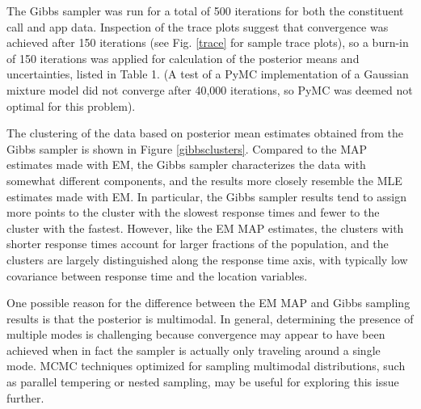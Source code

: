 \documentclass[twoside]{article}
\theoremstyle{theorem}
\theoremstyle{theorem}
\theoremstyle{theorem}
\theoremstyle{lemma}
\theoremstyle{definition}
\theoremstyle{example}
\begin{document}
The Gibbs sampler was run for a total of 500 iterations for both the constituent call and app data. Inspection of the trace plots suggest that convergence was achieved after 150 iterations (see Fig. \ref{trace} for sample trace plots), so a burn-in of 150 iterations was applied for calculation of the posterior means and uncertainties, listed in Table 1. (A test of a PyMC implementation of a Gaussian mixture model did not converge after 40,000 iterations, so PyMC was deemed not optimal for this problem). 

The clustering of the data based on posterior mean estimates obtained from the Gibbs sampler is shown in Figure \ref{gibbsclusters}. Compared to the MAP estimates made with EM, the Gibbs sampler characterizes the data with somewhat different components, and the results more closely resemble the MLE estimates made with EM. In particular, the Gibbs sampler results tend to assign more points to the cluster with the slowest response times and fewer to the cluster with the fastest. However, like the EM MAP estimates, the clusters with shorter response times account for larger fractions of the population, and the clusters are largely distinguished along the response time axis, with typically low covariance between response time and the location variables. 

One possible reason for the difference between the EM MAP and Gibbs sampling results is that the posterior is multimodal. In general, determining the presence of multiple modes is challenging because convergence may appear to have been achieved when in fact the sampler is actually only traveling around a single mode. MCMC techniques optimized for sampling multimodal distributions, such as parallel tempering or nested sampling, may be useful for exploring this issue further. 
\end{document}

